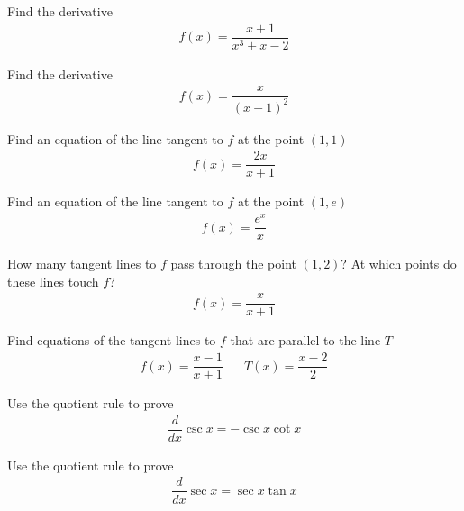 \begin{exercise}
Find the derivative
\begin{align*}
    f(x) = \dfrac{x+1}{x^{3}+x-2}
\end{align*}
\end{exercise}

\begin{exercise}
Find the derivative
\begin{align*}
    f(x) = \dfrac{x}{(x-1)^{2}}
\end{align*}
\end{exercise}

\begin{exercise}
Find an equation of the line tangent to $f$ at the point $(1, 1)$
\begin{align*}
    f(x) = \dfrac{2x}{x+1}
\end{align*}
\end{exercise}

\begin{exercise}
Find an equation of the line tangent to $f$ at the point $(1, e)$
\begin{align*}
    f(x) = \dfrac{e^{x}}{x}
\end{align*}
\end{exercise}

\begin{exercise}
How many tangent lines to $f$ pass through the point $(1, 2)$? At which points do these lines touch $f$?
\begin{align*}
    f(x) = \dfrac{x}{x+1}
\end{align*}
\end{exercise}

\begin{exercise}
Find equations of the tangent lines to $f$ that are parallel to the line $T$
\begin{align*}
    f(x) = \dfrac{x-1}{x+1} \hspace{20pt} T(x) = \dfrac{x-2}{2}
\end{align*}
\end{exercise}

\begin{exercise}
Use the quotient rule to prove
\begin{align*}
    \dfrac{d}{dx} \csc x = -\csc x \cot x
\end{align*}
\end{exercise}

\begin{exercise}
Use the quotient rule to prove
\begin{align*}
    \dfrac{d}{dx} \sec x = \sec x \tan x
\end{align*}
\end{exercise}

